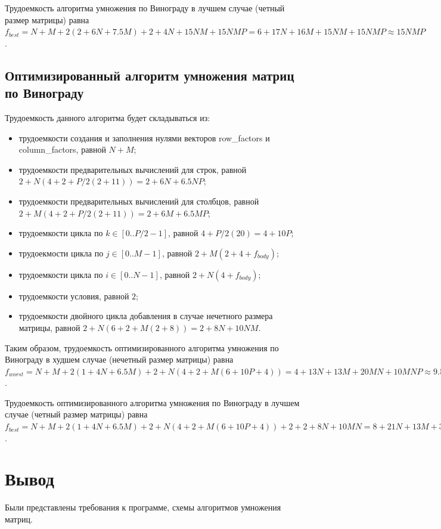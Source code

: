 Трудоемкость алгоритма умножения по Винограду в лучшем случае (четный размер матрицы) равна $f_{best} = N + M + 2(2 + 6N + 7.5M) + 2 + 4N + 15NM + 15NMP = 6 + 17N + 16M + 15NM + 15NMP \approx 15NMP$.

\subsection{Оптимизированный алгоритм умножения матриц по Винограду}

Трудоемкость данного алгоритма будет складываться из:

\begin{itemize}
	\item трудоемкости создания и заполнения нулями векторов row\_factors и column\_factors, равной $N + M$;
	\item трудоемкости предварительных вычислений для строк, равной $2 + N(4 + 2 + P/2(2 + 11)) = 2 + 6N + 6.5NP$;
	\item трудоемкости предварительных вычислений для столбцов, равной $2 + M(4 + 2 + P/2(2 + 11)) = 2 + 6M + 6.5MP$;
	\item трудоемкости цикла по $k \in [0..P/2-1]$, равной $4 + P/2(20) = 4 + 10P$;
	\item трудоекмости цикла по $j \in [0..M-1]$, равной $2 + M(2 + 4 + f_{body})$;
	\item трудоемкости цикла по $i \in [0..N-1]$, равной $2 + N(4 + f_{body})$;
	\item трудоемкости условия, равной $2$;
	\item трудоемкости двойного цикла добавления в случае нечетного размера матрицы, равной $2 + N(6 + 2 + M(2 + 8)) = 2 + 8N + 10NM$.
\end{itemize}

Таким образом, трудоемкость оптимизированного алгоритма умножения по Винограду в худшем случае (нечетный размер матрицы) равна $f_{worst} = N + M + 2(1 + 4N + 6.5M) + 2 + N(4 + 2 + M(6 + 10P + 4)) = 4 + 13N + 13M + 20MN + 10MNP \approx 9.5NMP$.

Трудоемкость оптимизированного алгоритма умножения по Винограду в лучшем случае (четный размер матрицы) равна $f_{best} = N + M + 2(1 + 4N + 6.5M) + 2 + N(4 + 2 + M(6 + 10P + 4)) + 2 + 2 + 8N + 10MN = 8 + 21N + 13M + 30MN + 10MNP \approx 9.5NMP$.

\section{Вывод}

Были представлены требования к программе, схемы алгоритмов умножения матриц.
